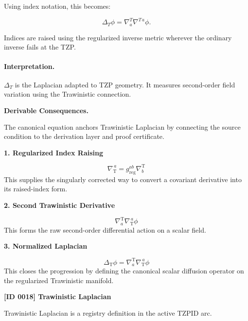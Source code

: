 Using index notation, this becomes:

\begin{equation}
\boxed{
\Delta_T\phi
=
\nabla^{T}_{a}\nabla^{T\,a}\phi .
}
\end{equation}

Indices are raised using the regularized inverse metric wherever the ordinary inverse fails at the TZP.

\paragraph{Interpretation.}
$\Delta_T$ is the Laplacian adapted to TZP geometry. It measures second-order field variation using the Trawinistic connection.

\par\vspace{0.35em}
\noindent\textbf{Derivable Consequences.}\quad
\begingroup
\footnotesize
\raggedright
The canonical equation anchors Trawinistic Laplacian by connecting the source condition to the derivation layer and proof certificate.
\par\endgroup

\noindent\textbf{1. Regularized Index Raising}\par
\[
\nabla_{\mathrm{T}}^{\,a}
=
g_{\mathrm{reg}}^{ab}\nabla^{\mathrm{T}}_{b}
\]
\noindent This supplies the singularly corrected way to convert a covariant derivative into its raised-index form.\par
\noindent\textbf{2. Second Trawinistic Derivative}\par
\[
\nabla^{\mathrm{T}}_{a}\nabla_{\mathrm{T}}^{\,a}\phi
\]
\noindent This forms the raw second-order differential action on a scalar field.\par
\noindent\textbf{3. Normalized Laplacian}\par
\[
\Delta_{\mathrm{T}}\phi
=
\nabla^{\mathrm{T}}_{a}\nabla_{\mathrm{T}}^{\,a}\phi
\]
\noindent This closes the progression by defining the canonical scalar diffusion operator on the regularized Trawinistic manifold.\par

\clearpage
\noindent\textbf{[ID 0018] Trawinistic Laplacian}\par
\vspace{0.35em}
\begingroup\small
{}
Trawinistic Laplacian is a registry definition in the active TZPID arc.

